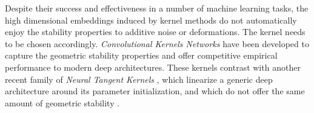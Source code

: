 Despite their success and effectiveness in 
a number of machine learning tasks, the high
dimensional embeddings induced by kernel
methods do not automatically 
enjoy the stability
properties to additive noise or deformations.
The kernel needs to be chosen accordingly. 
\emph{Convolutional Kernels Networks} \cite{mairal2014convolutional,bietti2017group} 
have been developed to capture the geometric stability properties 
and offer competitive empirical performance to modern deep architectures. 
These kernels contrast with another recent family of \emph{Neural Tangent Kernels} 
\cite{jacot2018neural}, which linearize a generic deep architecture around 
its parameter initialization, and which do not offer the same amount of geometric stability \cite{bietti2019inductive}. 

